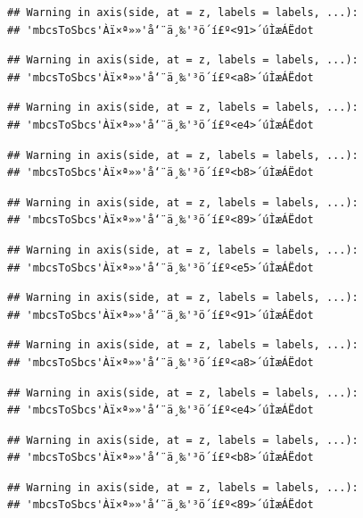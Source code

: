 \documentclass[
]{article}
\begin{document}
\begin{verbatim}
## Warning in axis(side, at = z, labels = labels, ...):
## 'mbcsToSbcs'Àï×ª»»'å‘¨ä¸‰'³ö´í£º<91>´úÌæÁËdot
\end{verbatim}

\begin{verbatim}
## Warning in axis(side, at = z, labels = labels, ...):
## 'mbcsToSbcs'Àï×ª»»'å‘¨ä¸‰'³ö´í£º<a8>´úÌæÁËdot
\end{verbatim}

\begin{verbatim}
## Warning in axis(side, at = z, labels = labels, ...):
## 'mbcsToSbcs'Àï×ª»»'å‘¨ä¸‰'³ö´í£º<e4>´úÌæÁËdot
\end{verbatim}

\begin{verbatim}
## Warning in axis(side, at = z, labels = labels, ...):
## 'mbcsToSbcs'Àï×ª»»'å‘¨ä¸‰'³ö´í£º<b8>´úÌæÁËdot
\end{verbatim}

\begin{verbatim}
## Warning in axis(side, at = z, labels = labels, ...):
## 'mbcsToSbcs'Àï×ª»»'å‘¨ä¸‰'³ö´í£º<89>´úÌæÁËdot
\end{verbatim}

\begin{verbatim}
## Warning in axis(side, at = z, labels = labels, ...):
## 'mbcsToSbcs'Àï×ª»»'å‘¨ä¸‰'³ö´í£º<e5>´úÌæÁËdot
\end{verbatim}

\begin{verbatim}
## Warning in axis(side, at = z, labels = labels, ...):
## 'mbcsToSbcs'Àï×ª»»'å‘¨ä¸‰'³ö´í£º<91>´úÌæÁËdot
\end{verbatim}

\begin{verbatim}
## Warning in axis(side, at = z, labels = labels, ...):
## 'mbcsToSbcs'Àï×ª»»'å‘¨ä¸‰'³ö´í£º<a8>´úÌæÁËdot
\end{verbatim}

\begin{verbatim}
## Warning in axis(side, at = z, labels = labels, ...):
## 'mbcsToSbcs'Àï×ª»»'å‘¨ä¸‰'³ö´í£º<e4>´úÌæÁËdot
\end{verbatim}

\begin{verbatim}
## Warning in axis(side, at = z, labels = labels, ...):
## 'mbcsToSbcs'Àï×ª»»'å‘¨ä¸‰'³ö´í£º<b8>´úÌæÁËdot
\end{verbatim}

\begin{verbatim}
## Warning in axis(side, at = z, labels = labels, ...):
## 'mbcsToSbcs'Àï×ª»»'å‘¨ä¸‰'³ö´í£º<89>´úÌæÁËdot
\end{verbatim}
\end{document}
